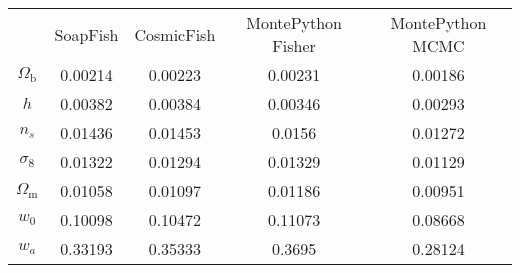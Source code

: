 \begin{table}
\centering
\begin{tabular}{|c|c|c|c|c|}
 & SoapFish & CosmicFish & MontePython Fisher & MontePython MCMC \\
$\Omega_\mathrm{b}$ & 0.00214 & 0.00223 & 0.00231 & 0.00186 \\
$h$ & 0.00382 & 0.00384 & 0.00346 & 0.00293 \\
$n_s$ & 0.01436 & 0.01453 & 0.0156 & 0.01272 \\
$\sigma_8$ & 0.01322 & 0.01294 & 0.01329 & 0.01129 \\
$\Omega_\mathrm{m}$ & 0.01058 & 0.01097 & 0.01186 & 0.00951 \\
$w_0$ & 0.10098 & 0.10472 & 0.11073 & 0.08668 \\
$w_a$ & 0.33193 & 0.35333 & 0.3695 & 0.28124 \\
\end{tabular}
\end{table}
